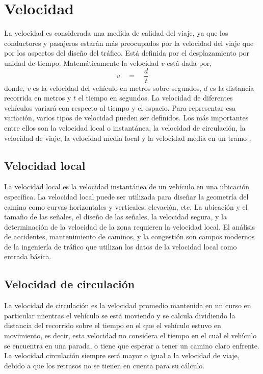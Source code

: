 \section{Velocidad}

La velocidad es considerada una medida de calidad del viaje, ya que los conductores y pasajeros estarán más preocupados por la velocidad del viaje que por los aspectos del diseño del tráfico. Está definida por el desplazamiento por unidad de tiempo. Matemáticamente la velocidad $v$ está dada por,
\begin{equation}
v\quad =\quad \frac { d }{ t }
\end{equation}
donde, $v$ es la velocidad del vehículo en metros sobre segundos, $d$ es la distancia recorrida en metros y $t$ el tiempo en segundos. La velocidad de diferentes vehículos variará con respecto al tiempo y el espacio. Para representar esa variación, varios tipos de velocidad pueden ser definidos. Los más importantes entre ellos son la velocidad local o instantánea, la velocidad de circulación, la velocidad de viaje, la velocidad media local y la velocidad media en un tramo \cite{may1990fundamentals}.

\subsection{Velocidad local}

La velocidad local es la velocidad instantánea de un vehículo en una ubicación específica. La velocidad local puede ser utilizada para diseñar la geometría del camino como curvas horizontales y verticales, elevación, etc. La ubicación y el tamaño de las señales, el diseño de las señales, la velocidad segura, y la determinación de la velocidad de la zona requieren la velocidad local. El análisis de accidentes, mantenimiento de caminos, y la congestión son campos modernos de la ingeniería de tráfico que utilizan los datos de la velocidad local como entrada básica. 

\subsection{Velocidad de circulación}

La velocidad de circulación es la velocidad promedio mantenida en un curso en particular mientras el vehículo se está moviendo y se calcula dividiendo la distancia del recorrido sobre el tiempo en el que el vehículo estuvo en movimiento, es decir, esta velocidad no considera el tiempo en el cual el vehículo se encuentra en una parada, o tiene que esperar a tener un camino claro enfrente. La velocidad circulación siempre será mayor o igual a la velocidad de viaje, debido a que los retrasos no se tienen en cuenta para su cálculo.

